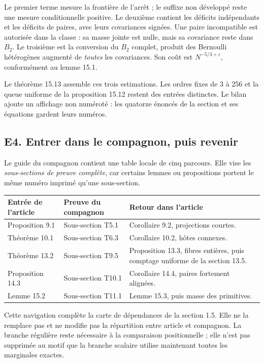 \documentclass[11pt,a4paper]{article}
\newcommand{\eps}{\varepsilon}
\begin{document}
Le premier terme mesure la frontière de l'arrêt ; le suffixe non
développé reste une mesure conditionnelle positive. Le deuxième
contient les déficits indépendants et les déficits de paires, avec
leurs covariances signées. Une paire incompatible est autorisée dans
la classe : sa masse jointe est nulle, mais sa covariance reste dans
\(B_2\). Le troisième est la conversion du \(B_2\) complet, produit
des Bernoulli hétérogènes augmenté de \emph{toutes} les covariances.
Son coût est \(N^{-5/3+\eps}\), conformément au lemme 15.1.

Le théorème 15.13 assemble ces trois estimations. Les ordres fixes
de 3 à 256 et la queue uniforme de la proposition 15.12 restent
des entrées distinctes. Le bilan ajoute un affichage non numéroté :
les quatorze énoncés de la section et ses équations gardent leurs numéros.

\subsection*{E4. Entrer dans le compagnon, puis revenir}
Le guide du compagnon contient une table locale de cinq parcours.
Elle vise les \emph{sous-sections de preuve complète}, car certains
lemmes ou propositions portent le même numéro imprimé qu'une sous-section.

\small
\begin{tabularx}{\textwidth}{@{}>{\raggedright\arraybackslash}p{}>{\raggedright\arraybackslash}p{}>{\raggedright\arraybackslash}X@{}}
\toprule
Entrée de l'article & Preuve du compagnon & Retour dans l'article\\
\midrule
Proposition 9.1 & Sous-section T5.1 & Corollaire 9.2, projections courtes.\\[5pt]
Théorème 10.1 & Sous-section T6.3 & Corollaire 10.2, hôtes connexes.\\[5pt]
Théorème 13.2 & Sous-section T9.5 & Proposition 13.3, fibres entières,
puis comptage uniforme de la section 13.5.\\[5pt]
Proposition 14.3 & Sous-section T10.1 & Corollaire 14.4, paires fortement alignées.\\[5pt]
Lemme 15.2 & Sous-section T11.1 & Lemme 15.3, puis masse des primitives.\\
\bottomrule
\end{tabularx}
\normalsize

Cette navigation complète la carte de dépendances de la section 1.5.
Elle ne la remplace pas et ne modifie pas la répartition entre article
et compagnon. La branche régulière reste nécessaire à la comparaison
positionnelle ; elle n'est pas supprimée au motif que la branche
scalaire utilise maintenant toutes les marginales exactes.
\end{document}
